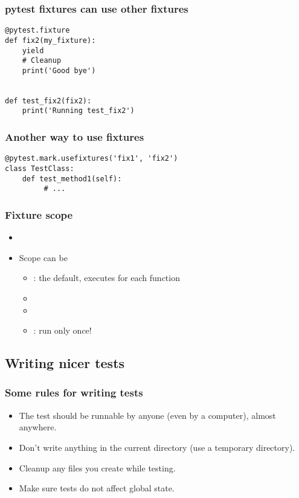 \documentclass[14pt,compress]{beamer}
\begin{document}
\begin{frame}[fragile]
  \frametitle{pytest fixtures can use other fixtures}
  \begin{lstlisting}
@pytest.fixture
def fix2(my_fixture):
    yield
    # Cleanup
    print('Good bye')


def test_fix2(fix2):
    print('Running test_fix2')
  \end{lstlisting}
\end{frame}

\begin{frame}[fragile]
  \frametitle{Another way to use fixtures}
  \begin{lstlisting}
@pytest.mark.usefixtures('fix1', 'fix2')
class TestClass:
    def test_method1(self):
         # ...
  \end{lstlisting}
\end{frame}

\begin{frame}
  \frametitle{Fixture scope}
  \begin{itemize}
  \item {}
  \item Scope can be
    \begin{itemize}
    \item {}: the default, executes for each function
    \item {}
    \item {}
    \item {}: run only once!
    \end{itemize}
  \end{itemize}
\end{frame}

\subsection{Writing nicer tests}

\begin{frame}
  \frametitle{Some rules for writing tests}
  \begin{itemize}
  \item The test should be runnable by anyone (even by a computer), almost anywhere.
  \item Don't write anything in the current directory (use a temporary directory).
  \item Cleanup any files you create while testing.
  \item Make sure tests do not affect global state.
  \end{itemize}
\end{frame}
\end{document}
